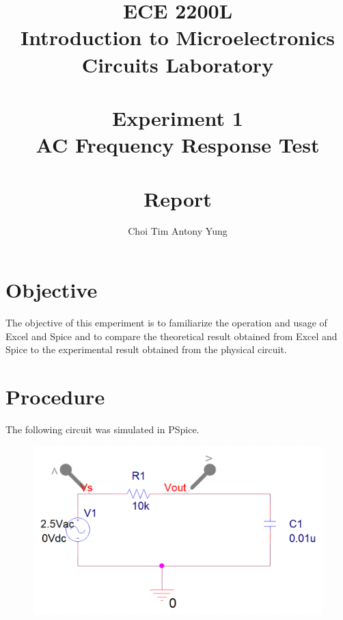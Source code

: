 \documentclass{article}
\title{ECE 2200L\\Introduction to Microelectronics Circuits Laboratory\\\,\\Experiment 1\\AC Frequency Response Test\\\,\\Report}
\author{Choi Tim Antony Yung}
\begin{document}
\maketitle

\thispagestyle{empty}
\setcounter{page}{0}

\newpage

\section*{Objective}

The objective of this emperiment is to familiarize the operation and usage of Excel and Spice and to compare the theoretical result obtained from Excel and Spice to the experimental result obtained from the physical circuit.

\section*{Procedure}
The following circuit was simulated in PSpice.
\begin{figure}[H]
  \centering
  \includegraphics[width=\textwidth]{ECE2200_Lab1_pspice_schematic.png}
\end{figure}
\end{document}
